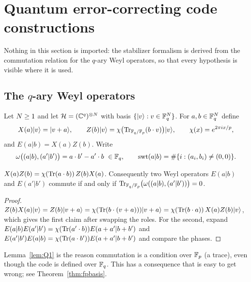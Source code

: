 \section{Quantum error-correcting code constructions}
\label{sec:quantum}

Nothing in this section is imported: the stabilizer formalism is derived from
the commutation relation for the $q$-ary Weyl operators, so that every
hypothesis is visible where it is used.

\subsection{The \texorpdfstring{$q$}{q}-ary Weyl operators}

Let $N\ge1$ and let $\mathcal H=(\mathbb C^q)^{\otimes N}$ with basis
$\{|v\rangle:v\in\mathbb F_q^{N}\}$. For $a,b\in\mathbb F_q^{N}$ define
\begin{equation}\label{eq:weyl}
  X(a)|v\rangle=|v+a\rangle,\qquad
  Z(b)|v\rangle=\chi\bigl(\operatorname{Tr}_{\mathbb F_q/\mathbb F_p}(b\cdot v)\bigr)|v\rangle,
  \qquad \chi(x)=e^{2\pi i x/p},
\end{equation}
and $E(a|b)=X(a)Z(b)$. Write
\begin{equation}\label{eq:omega}
  \omega\bigl((a|b),(a'|b')\bigr)=a\cdot b'-a'\cdot b\ \in\mathbb F_q,
  \qquad
  \operatorname{swt}(a|b)=\#\{i:(a_i,b_i)\ne(0,0)\}.
\end{equation}

\begin{lemma}[commutation]\label{lem:Q1}
$X(a)Z(b)=\chi(\operatorname{Tr}(a\cdot b))\,Z(b)X(a)$. Consequently two Weyl operators
$E(a|b)$ and $E(a'|b')$ commute if and only if
$\operatorname{Tr}_{\mathbb F_q/\mathbb F_p}\bigl(\omega((a|b),(a'|b'))\bigr)=0$.
\end{lemma}

\begin{proof}
$Z(b)X(a)|v\rangle=Z(b)|v+a\rangle
=\chi(\operatorname{Tr}(b\cdot(v+a)))|v+a\rangle
=\chi(\operatorname{Tr}(b\cdot a))\,X(a)Z(b)|v\rangle$, which gives the first claim after
swapping the roles. For the second, expand
$E(a|b)E(a'|b')=\chi(\operatorname{Tr}(a'\cdot b))E(a+a'|b+b')$ and
$E(a'|b')E(a|b)=\chi(\operatorname{Tr}(a\cdot b'))E(a+a'|b+b')$ and compare the phases.
\end{proof}

Lemma~\ref{lem:Q1} is the reason commutation is a condition over $\mathbb F_p$ (a
trace), even though the code is defined over $\mathbb F_q$. This has a consequence that
is easy to get wrong; see Theorem~\ref{thm:fpbasis}.

